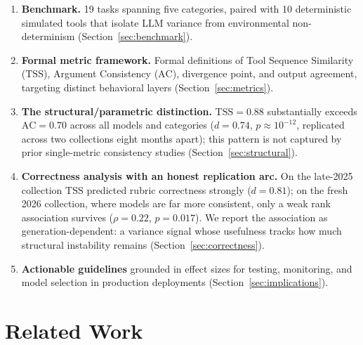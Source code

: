 \documentclass[11pt]{article}
\newcommand{\tss}{\mathrm{TSS}}
\newcommand{\ac}{\mathrm{AC}}
\begin{document}
\begin{enumerate}[leftmargin=1.5em]
  \item \textbf{Benchmark.} 19 tasks spanning five categories, paired with
    10 deterministic simulated tools that isolate LLM variance from
    environmental non-determinism (Section~\ref{sec:benchmark}).
  \item \textbf{Formal metric framework.} Formal definitions of Tool Sequence
    Similarity ($\tss$), Argument Consistency ($\ac$), divergence point, and
    output agreement, targeting distinct behavioral layers
    (Section~\ref{sec:metrics}).
  \item \textbf{The structural/parametric distinction.} $\tss = 0.88$ substantially
    exceeds $\ac = 0.70$ across all models and categories ($d = 0.74$,
    $p \approx 10^{-12}$, replicated across two collections eight months
    apart); this pattern is not captured by prior single-metric
    consistency studies (Section~\ref{sec:structural}).
  \item \textbf{Correctness analysis with an honest replication arc.} On the
    late-2025 collection $\tss$ predicted rubric correctness strongly
    ($d = 0.81$); on the fresh 2026 collection, where models are far more
    consistent, only a weak rank association survives ($\rho = 0.22$,
    $p = 0.017$). We report the association as generation-dependent: a variance
    signal whose usefulness tracks how much structural instability remains
    (Section~\ref{sec:correctness}).
  \item \textbf{Actionable guidelines} grounded in effect sizes for testing,
    monitoring, and model selection in production deployments
    (Section~\ref{sec:implications}).
\end{enumerate}

\section{Related Work}
\end{document}
